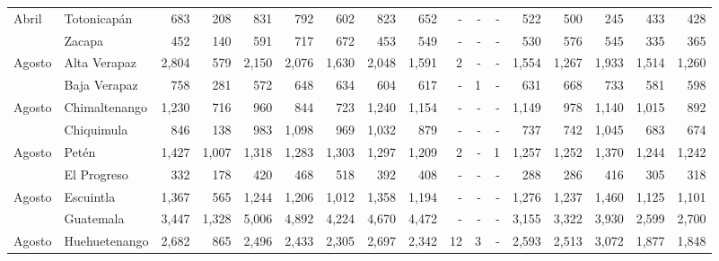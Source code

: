 \begin{landscape}
\begin{center}
\begin{longtable}{llrrrrrrrrrrrrrrr}
\multicolumn{1}{l}{	\footnotesize	 Abril 	}&	 Totonicapán 	&	 683 	&	 208 	&	 831 	&	 792 	&	 602 	&	 823 	&	 652 	&	 -   	&	 -   	&	 -   	&	 522 	&	 500 	&	 245 	&	 433 	&	 428 	\\
\rowcolor{color1!5!white}\multicolumn{1}{l}{	\footnotesize	 Abril 	}&	 Zacapa 	&	 452 	&	 140 	&	 591 	&	 717 	&	 672 	&	 453 	&	 549 	&	 -   	&	 -   	&	 -   	&	 530 	&	 576 	&	 545 	&	 335 	&	 365 	\\
\multicolumn{1}{l}{	\footnotesize	 Agosto 	}&	 Alta Verapaz 	&	 2,804 	&	 579 	&	 2,150 	&	 2,076 	&	 1,630 	&	 2,048 	&	 1,591 	&	 2 	&	 -   	&	 -   	&	 1,554 	&	 1,267 	&	 1,933 	&	 1,514 	&	 1,260 	\\
\rowcolor{color1!5!white}\multicolumn{1}{l}{	\footnotesize	 Agosto 	}&	 Baja Verapaz 	&	 758 	&	 281 	&	 572 	&	 648 	&	 634 	&	 604 	&	 617 	&	 -   	&	 1 	&	 -   	&	 631 	&	 668 	&	 733 	&	 581 	&	 598 	\\
\multicolumn{1}{l}{	\footnotesize	 Agosto 	}&	 Chimaltenango 	&	 1,230 	&	 716 	&	 960 	&	 844 	&	 723 	&	 1,240 	&	 1,154 	&	 -   	&	 -   	&	 -   	&	 1,149 	&	 978 	&	 1,140 	&	 1,015 	&	 892 	\\
\rowcolor{color1!5!white}\multicolumn{1}{l}{	\footnotesize	 Agosto 	}&	 Chiquimula 	&	 846 	&	 138 	&	 983 	&	 1,098 	&	 969 	&	 1,032 	&	 879 	&	 -   	&	 -   	&	 -   	&	 737 	&	 742 	&	 1,045 	&	 683 	&	 674 	\\
\multicolumn{1}{l}{	\footnotesize	 Agosto 	}&	 Petén 	&	 1,427 	&	 1,007 	&	 1,318 	&	 1,283 	&	 1,303 	&	 1,297 	&	 1,209 	&	 2 	&	 -   	&	 1 	&	 1,257 	&	 1,252 	&	 1,370 	&	 1,244 	&	 1,242 	\\
\rowcolor{color1!5!white}\multicolumn{1}{l}{	\footnotesize	 Agosto 	}&	 El Progreso 	&	 332 	&	 178 	&	 420 	&	 468 	&	 518 	&	 392 	&	 408 	&	 -   	&	 -   	&	 -   	&	 288 	&	 286 	&	 416 	&	 305 	&	 318 	\\
\multicolumn{1}{l}{	\footnotesize	 Agosto 	}&	 Escuintla 	&	 1,367 	&	 565 	&	 1,244 	&	 1,206 	&	 1,012 	&	 1,358 	&	 1,194 	&	 -   	&	 -   	&	 -   	&	 1,276 	&	 1,237 	&	 1,460 	&	 1,125 	&	 1,101 	\\
\rowcolor{color1!5!white}\multicolumn{1}{l}{	\footnotesize	 Agosto 	}&	 Guatemala 	&	 3,447 	&	 1,328 	&	 5,006 	&	 4,892 	&	 4,224 	&	 4,670 	&	 4,472 	&	 -   	&	 -   	&	 -   	&	 3,155 	&	 3,322 	&	 3,930 	&	 2,599 	&	 2,700 	\\
\multicolumn{1}{l}{	\footnotesize	 Agosto 	}&	 Huehuetenango 	&	 2,682 	&	 865 	&	 2,496 	&	 2,433 	&	 2,305 	&	 2,697 	&	 2,342 	&	 12 	&	 3 	&	 -   	&	 2,593 	&	 2,513 	&	 3,072 	&	 1,877 	&	 1,848 	\\

\end{longtable}
\end{center}
\end{landscape}
